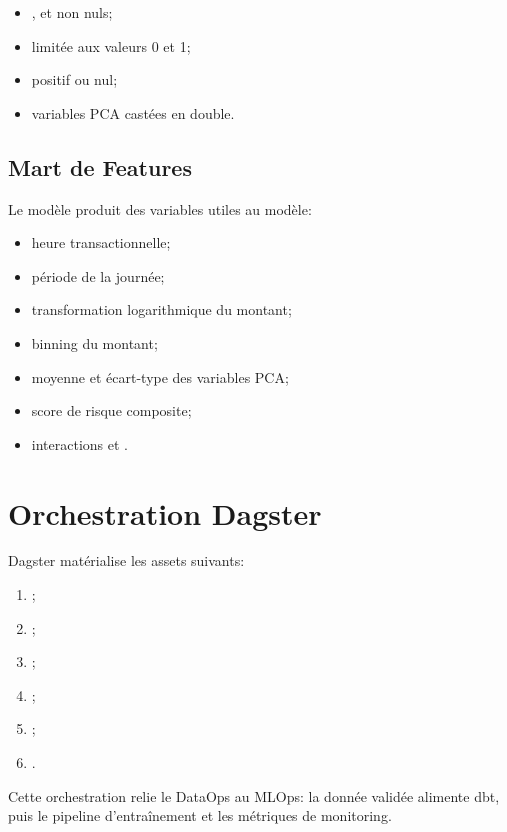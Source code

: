 \begin{itemize}
    \item {},  et  non nuls;
    \item {} limitée aux valeurs 0 et 1;
    \item {} positif ou nul;
    \item variables PCA castées en double.
\end{itemize}

\subsection{Mart de Features}

Le modèle  produit des variables utiles au modèle:

\begin{itemize}
    \item heure transactionnelle;
    \item période de la journée;
    \item transformation logarithmique du montant;
    \item binning du montant;
    \item moyenne et écart-type des variables PCA;
    \item score de risque composite;
    \item interactions  et .
\end{itemize}

\section{Orchestration Dagster}

Dagster matérialise les assets suivants:

\begin{enumerate}
    \item {};
    \item {};
    \item {};
    \item {};
    \item {};
    \item {}.
\end{enumerate}

Cette orchestration relie le DataOps au MLOps: la donnée validée alimente dbt, puis le pipeline d'entraînement et les métriques de monitoring.

